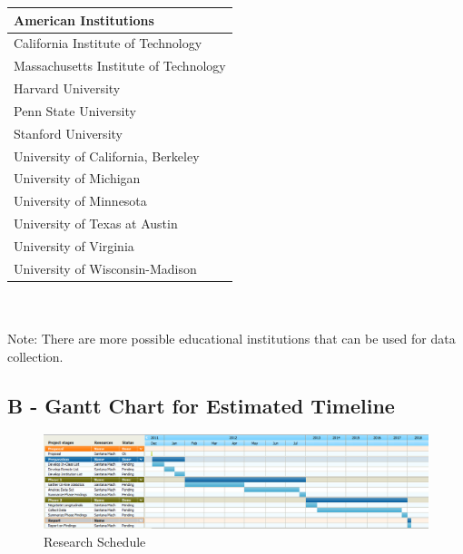 \documentclass[titlepage]{article}
\begin{document}
\noindent \begin{tabular}{l}
\textbf{American Institutions} \\
\hline
California Institute of Technology \\
Massachusetts Institute of Technology \\
Harvard University \\
Penn State University \\
Stanford University \\
University of California, Berkeley \\
University of Michigan \\
University of Minnesota \\
University of Texas at Austin \\
University of Virginia \\
University of Wisconsin-Madison \\
\end{tabular}
\\\\
Note: There are more possible educational institutions that can be used for data collection.

\subsection{B - Gantt Chart for Estimated Timeline}
\begin{figure}[htb]                                                                       
  \begin{center}
     \includegraphics[width=1\textwidth]{Gantt.png}
  \end{center}
  \caption{Research Schedule}
  \label{fig:schedule}
\end{figure}
\end{document}
